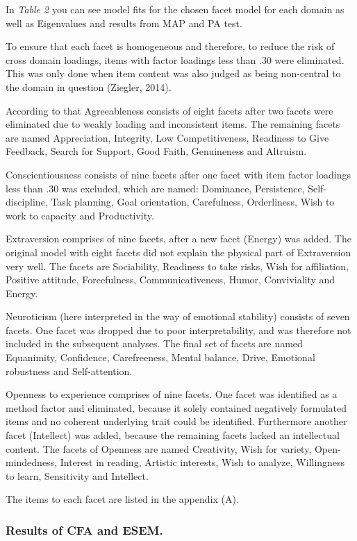 \documentclass[floatsintext,man]{apa6}
\theoremstyle{definition}
\theoremstyle{definition}
\theoremstyle{definition}
\theoremstyle{remark}
\begin{document}
In \emph{Table 2} you can see model fits for the chosen facet model for
each domain as well as Eigenvalues and results from MAP and PA test.

To ensure that each facet is homogeneous and therefore, to reduce the
risk of cross domain loadings, items with factor loadings less than .30
were eliminated. This was only done when item content was also judged as
being non-central to the domain in question (Ziegler, 2014).

According to that Agreeableness consists of eight facets after two
facets were eliminated due to weakly loading and inconsistent items. The
remaining facets are named Appreciation, Integrity, Low Competitiveness,
Readiness to Give Feedback, Search for Support, Good Faith, Genuineness
and Altruism.

Conscientiousness consists of nine facets after one facet with item
factor loadings less than .30 was excluded, which are named: Dominance,
Persistence, Self-discipline, Task planning, Goal orientation,
Carefulness, Orderliness, Wish to work to capacity and Productivity.

Extraversion comprises of nine facets, after a new facet (Energy) was
added. The original model with eight facets did not explain the physical
part of Extraversion very well. The facets are Sociability, Readiness to
take risks, Wish for affiliation, Positive attitude, Forcefulness,
Communicativeness, Humor, Conviviality and Energy.

Neuroticism (here interpreted in the way of emotional stability)
consists of seven facets. One facet was dropped due to poor
interpretability, and was therefore not included in the subsequent
analyses. The final set of facets are named Equanimity, Confidence,
Carefreeness, Mental balance, Drive, Emotional robustness and
Self-attention.

Openness to experience comprises of nine facets. One facet was
identified as a method factor and eliminated, because it solely
contained negatively formulated items and no coherent underlying trait
could be identified. Furthermore another facet (Intellect) was added,
because the remaining facets lacked an intellectual content. The facets
of Openness are named Creativity, Wish for variety, Open-mindedness,
Interest in reading, Artistic interests, Wish to analyze, Willingness to
learn, Sensitivity and Intellect.

The items to each facet are listed in the appendix (A).

\hypertarget{results-of-cfa-and-esem.}{%
\subsubsection{Results of CFA and
ESEM.}\label{results-of-cfa-and-esem.}}
\end{document}
